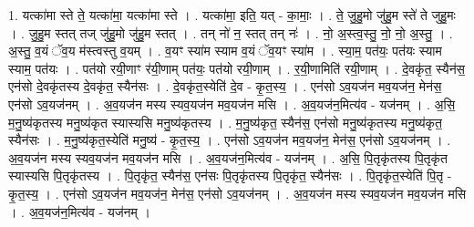 \documentclass[17pt]{extarticle}
\begin{document}
1. यत्का॑मा स्ते ते॒ यत्का॑मा॒ यत्का॑मा स्ते । . यत्का॑मा॒ इति॒ यत् - का॒माः॒ । . ते॒ जु॒हु॒मो जु॑हु॒म स्ते॑ ते जुहु॒मः । . जु॒हु॒म स्तत् तज् जु॑हु॒मो जु॑हु॒म स्तत् । . तन् नो॑ न॒ स्तत् तन् नः॑ । . नो॒ अ॒स्त्व॒स्तु॒ नो॒ नो॒ अ॒स्तु॒ । . अ॒स्तु॒ व॒यं ॅव॒य म॑स्त्वस्तु व॒यम् । . व॒यꣳ स्या॑म स्याम व॒यं ॅव॒यꣳ स्या॑म । . स्या॒म॒ पत॑यः॒ पत॑यः स्याम स्याम॒ पत॑यः । . पत॑यो रयी॒णाꣳ र॑यी॒णाम् पत॑यः॒ पत॑यो रयी॒णाम् । . र॒यी॒णामिति॑ रयी॒णाम् । . दे॒वकृ॑त॒ स्यैन॑स॒ एन॑सो दे॒वकृ॑तस्य दे॒वकृ॑त॒ स्यैन॑सः । . दे॒वकृ॑त॒स्येति॑ दे॒व - कृ॒त॒स्य॒ । . एन॑सो ऽव॒यज॑न मव॒यज॑न॒ मेन॑स॒ एन॑सो ऽव॒यज॑नम् । . अ॒व॒यज॑न मस्य स्यव॒यज॑न मव॒यज॑न मसि । . अ॒व॒यज॑न॒मित्य॑व - यज॑नम् । . अ॒सि॒ म॒नु॒ष्य॑कृतस्य मनु॒ष्य॑कृत स्यास्यसि मनु॒ष्य॑कृतस्य । . म॒नु॒ष्य॑कृत॒ स्यैन॑स॒ एन॑सो मनु॒ष्य॑कृतस्य मनु॒ष्य॑कृत॒ स्यैन॑सः । . म॒नु॒ष्य॑कृत॒स्येति॑ मनु॒ष्य॑ - कृ॒त॒स्य॒ । . एन॑सो ऽव॒यज॑न मव॒यज॑न॒ मेन॑स॒ एन॑सो ऽव॒यज॑नम् । . अ॒व॒यज॑न मस्य स्यव॒यज॑न मव॒यज॑न मसि । . अ॒व॒यज॑न॒मित्य॑व - यज॑नम् । . अ॒सि॒ पि॒तृकृ॑तस्य पि॒तृकृ॑त स्यास्यसि पि॒तृकृ॑तस्य । . पि॒तृकृ॑त॒ स्यैन॑स॒ एन॑सः पि॒तृकृ॑तस्य पि॒तृकृ॑त॒ स्यैन॑सः । . पि॒तृकृ॑त॒स्येति॑ पि॒तृ - कृ॒त॒स्य॒ । . एन॑सो ऽव॒यज॑न मव॒यज॑न॒ मेन॑स॒ एन॑सो ऽव॒यज॑नम् । . अ॒व॒यज॑न मस्य स्यव॒यज॑न मव॒यज॑न मसि । . अ॒व॒यज॑न॒मित्य॑व - यज॑नम् । \newline
\end{document}
